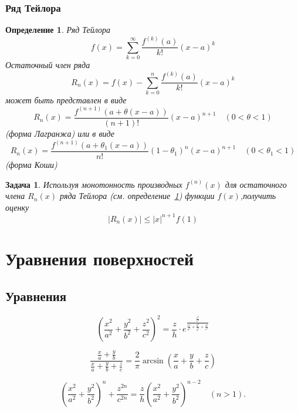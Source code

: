 \documentclass[a4paper,14pt]{article}
\newtheorem{definition}{Определение}
\newtheorem{task}{Задача}
\begin{document}
\subsubsection{Ряд Тейлора}
\begin{definition}
Ряд Тейлора 
\label{def:taylor}
\[ 
f(x) = \sum\limits_{k=0}^{\infty} \frac{f^{(k)} \left(a\right)}{k!} \left(x-a\right)^k
\]
Остаточный член ряда 
\[
R_n(x)=f(x) -  \sum\limits_{k=0}^{n} \frac{f^{(k)} \left(a\right)}{k!} \left(x-a\right)^k
\]
может быть представлен в виде 
\[
R_n(x)=\dfrac{f^{(n+1)}\left(a+\theta\left(x-a\right)\right)}{\left(n+1\right)!} \left(x-a\right)^{n+1} \quad (0<\theta<1)
\]
(форма Лагранжа) или в виде
\[
R_n(x)=\dfrac{f^{(n+1)}\left(a+\theta_1\left(x-a\right)\right)}{n!} \left( 1- \theta_1\right) ^n \left( x-a\right)^{n+1} \quad (0<\theta_1<1)
\]
(форма Коши)
\end{definition}

\begin{task}
Используя монотонность производных \(f^{(n)} (x)\) для остаточного члена \(R_n(x)\) ряда Тейлора (см. определение~\ref{def:taylor}) функции \(f(x)\),получить оценку
\[
|R_n(x)| \le |x|^{n+1}f(1)
\]
\end{task}

\section{Уравнения поверхностей}
 
\cite{art2}
 
\subsection{Уравнения}
\setcounter{equation}{4120}

\begin{equation}
\left( \frac{x^2}{a^2} + \frac{y^2}{b^2} +\frac{z^2}{c^2} \right) ^{2} = \frac{z}{h} \cdot e^{\frac{\frac{z^2}{c^2}}{\frac{x^2}{a^2}+\frac{y^2}{b^2}+\frac{z^2}{c^2}}}
\end{equation}

\begin{equation}
\frac{\frac{x}{a}+\frac{y}{b}}{\frac{x}{a}+\frac{y}{b}+\frac{z}{c}}=\frac{2}{\pi} \arcsin( \frac{x}{a}+\frac{y}{b}+\frac{z}{c} )
\end{equation}

\setcounter{equation}{4128}

\begin{equation}
\left( \frac{x^2}{a^2} + \frac{y^2}{b^2} \right) ^{n} + \frac{z^{2n}}{c^{2n}} = \frac{z}{h} \left( \frac{x^2}{a^2} +\frac{y^2}{b^2} \right)^{n-2} \quad (n>1).
\end{equation}
\end{document}
